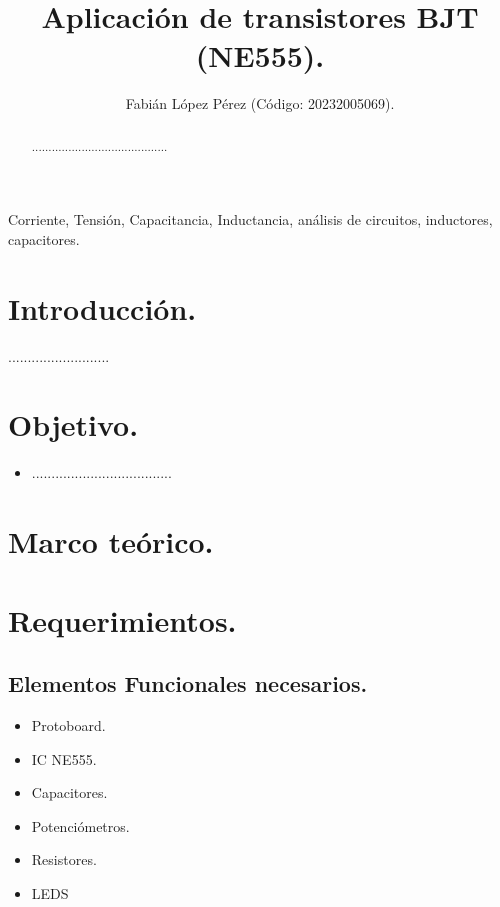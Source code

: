 \documentclass[journal]{IEEEtran}
\begin{document}
\title{Aplicación de transistores BJT (NE555).}
\author{Fabián López Pérez (Código: 20232005069).} 

\maketitle
\begin{abstract}
.........................................
\end{abstract}

\begin{IEEEkeywords}
Corriente, Tensión, Capacitancia, Inductancia, análisis de circuitos, inductores, capacitores.
\end{IEEEkeywords}

\section{\textbf{Introducción.}}
 ..........................
\section{\textbf{Objetivo.}}
    \begin{itemize}
        \item ....................................
    \end{itemize}

\section{\textbf{Marco teórico.}}
           
\section{\textbf{Requerimientos.}}
    \vspace{0.2cm}
    \subsection{\textbf{Elementos Funcionales necesarios.}}
        \vspace{0.2cm}
        \begin{itemize}
            \item Protoboard.
            \item IC NE555.
            \item Capacitores.
            \item Potenciómetros.
            \item Resistores.
            \item LEDS
        \end{itemize}
\end{document}
